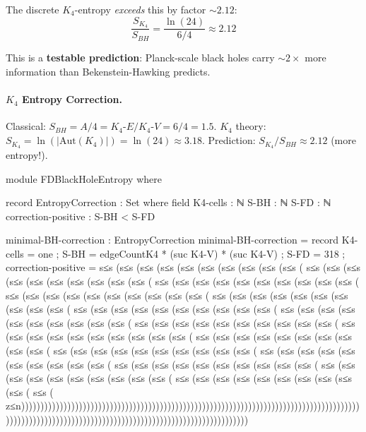 \documentclass[11pt,a4paper]{book}
\begin{document}
The discrete $K_4$-entropy \emph{exceeds} this by factor $\sim 2.12$:
$$\frac{S_{K_4}}{S_{BH}} = \frac{\ln(24)}{6/4} \approx 2.12$$

This is a \textbf{testable prediction}: Planck-scale black holes carry $\sim 2\times$ more information than Bekenstein-Hawking predicts.

\paragraph{$K_4$ Entropy Correction.}
Classical: $S_{BH} = A/4 = K_4\text{-}E / K_4\text{-}V = 6/4 = 1.5$.
$K_4$ theory: $S_{K_4} = \ln(|\mathrm{Aut}(K_4)|) = \ln(24) \approx 3.18$.
Prediction: $S_{K_4}/S_{BH} \approx 2.12$ (more entropy!).

\begin{code}
module FDBlackHoleEntropy where

  record EntropyCorrection : Set where
    field
      K4-cells : ℕ
      S-BH : ℕ
      S-FD : ℕ
      correction-positive : S-BH < S-FD
      
  minimal-BH-correction : EntropyCorrection
  minimal-BH-correction = record
    { K4-cells = one
    ; S-BH = edgeCountK4 * (suc K4-V) * (suc K4-V)
    ; S-FD = 318
    ; correction-positive = s≤s (s≤s (s≤s (s≤s (s≤s (s≤s (s≤s (s≤s (s≤s (s≤s (
                           s≤s (s≤s (s≤s (s≤s (s≤s (s≤s (s≤s (s≤s (s≤s (s≤s (
                           s≤s (s≤s (s≤s (s≤s (s≤s (s≤s (s≤s (s≤s (s≤s (s≤s (
                           s≤s (s≤s (s≤s (s≤s (s≤s (s≤s (s≤s (s≤s (s≤s (s≤s (
                           s≤s (s≤s (s≤s (s≤s (s≤s (s≤s (s≤s (s≤s (s≤s (s≤s (
                           s≤s (s≤s (s≤s (s≤s (s≤s (s≤s (s≤s (s≤s (s≤s (s≤s (
                           s≤s (s≤s (s≤s (s≤s (s≤s (s≤s (s≤s (s≤s (s≤s (s≤s (
                           s≤s (s≤s (s≤s (s≤s (s≤s (s≤s (s≤s (s≤s (s≤s (s≤s (
                           s≤s (s≤s (s≤s (s≤s (s≤s (s≤s (s≤s (s≤s (s≤s (s≤s (
                           s≤s (s≤s (s≤s (s≤s (s≤s (s≤s (s≤s (s≤s (s≤s (s≤s (
                           s≤s (s≤s (s≤s (s≤s (s≤s (s≤s (s≤s (s≤s (s≤s (s≤s (
                           s≤s (s≤s (s≤s (s≤s (s≤s (s≤s (s≤s (s≤s (s≤s (s≤s (
                           s≤s (s≤s (s≤s (s≤s (s≤s (s≤s (s≤s (s≤s (s≤s (s≤s (
                           s≤s (s≤s (s≤s (s≤s (s≤s (s≤s (s≤s (s≤s (s≤s (s≤s (
                           s≤s (s≤s (s≤s (s≤s (s≤s (s≤s (s≤s (s≤s (s≤s (s≤s (
                           s≤s (
                           z≤n)))))))))))))))))))))))))))))))))))))))))))))))))))))))))))))))))))))))))))))))))))))))))))))))))))))))))))))))))))))))))))))))))))))))))))))))))))))))
    }
  

\end{code}
\end{document}
